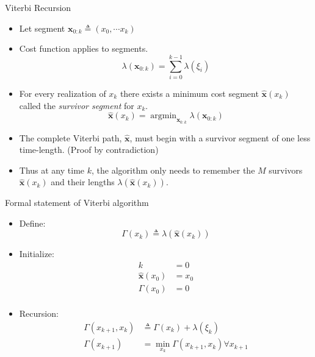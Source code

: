 \documentclass[xetex,mathserif,serif]{beamer}
\DeclareMathOperator*{\argmin}{argmin}
\begin{document}
\begin{frame}{Viterbi Recursion}
    \begin{itemize}
    \item Let segment $\mathbf x_{0:k} \triangleq (x_0, \cdots x_k)$
    \item Cost function applies to segments.
    \begin{equation}
        \lambda(\mathbf x_{0:k}) = \sum_{i=0}^{k-1} \lambda(\xi_i)
    \end{equation}
    \item For every realization of $x_k$ there exists a minimum cost segment
        $\mathbf{\hat x}(x_k)$ called the \emph{survivor segment} for $x_k$.
    \begin{equation}
        \mathbf{\hat x}(x_k) = \argmin_{\mathbf x_{0:k}} \lambda(\mathbf x_{0:k})
    \end{equation}
    \item The complete Viterbi path, $\mathbf{\hat x}$, must begin with a
          survivor segment of one less time-length. (Proof by contradiction)
    \item Thus at any time $k$, the algorithm only needs to remember the $M$
          survivors $\mathbf{\hat x}(x_k)$ and their lengths
          $\lambda (\mathbf{\hat x}(x_k))$.
    \end{itemize}
\end{frame}

\begin{frame}{Formal statement of Viterbi algorithm}
    \begin{itemize}
    \item Define:
        \begin{equation}
            \Gamma(x_k) \triangleq \lambda(\mathbf{\hat x}(x_k))
        \end{equation}
    \item Initialize:
    \begin{equation}
        \begin{aligned}
            k &= 0\\
            \mathbf{\hat x}(x_0) &= x_0\\
            \Gamma(x_0) &= 0\\
        \end{aligned}
    \end{equation}
    \item Recursion:
        \begin{equation}
            \begin{aligned}
                \Gamma(x_{k+1}, x_k) &\triangleq \Gamma(x_k) + \lambda(\xi_k)\\
                \Gamma(x_{k+1}) &= \min_{x_k} \Gamma(x_{k+1}, x_k) \forall
                    x_{k+1}
            \end{aligned}
        \end{equation}
    \end{itemize}
\end{frame}
\end{document}
